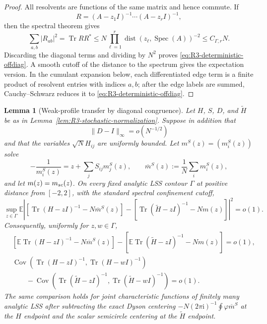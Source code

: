 \documentclass[10pt,a4paper]{amsart}
\newtheorem{lemma}[theorem]{Lemma}
\newcommand{\E}{\mathbb E}
\newcommand{\Cov}{\operatorname{Cov}}
\newcommand{\Tr}{\operatorname{Tr}}
\newcommand{\spec}{\operatorname{Spec}}
\newcommand{\ii}{\mathrm i}
\newcommand{\norm}[1]{\lVert #1\rVert}
\begin{document}
\begin{proof}
All resolvents are functions of the same matrix and hence commute.  If
\[
 R=(A-z_1I)^{-1}\cdots(A-z_rI)^{-1},
\]
then the spectral theorem gives
\[
 \sum_{a,b}|R_{ab}|^2=\Tr RR^*
 \le N\prod_{\ell=1}^r
 \operatorname{dist}(z_\ell,\spec(A))^{-2}
 \le C_{\Gamma,r}N.
\]
Discarding the diagonal terms and dividing by \(N^2\) proves
\eqref{eq:R3-deterministic-offdiag}.  A smooth cutoff of the distance to the
spectrum gives the expectation version.  In the cumulant expansion below,
each differentiated edge term is a finite product of resolvent entries with
indices \(a,b\); after the edge labels are summed, Cauchy--Schwarz reduces it
to \eqref{eq:R3-deterministic-offdiag}.
\end{proof}

\begin{lemma}[Weak-profile transfer by diagonal congruence]
\label{lem:R3-profile-interpolation}
Let \(H\), \(S\), \(D\), and \(\widetilde H\) be as in
Lemma~\ref{lem:R3-stochastic-normalization}.  Suppose in addition that
\begin{equation}\label{eq:R3-congruence-rate}
 \norm{D-I}_\infty=o(N^{-1/2})
\end{equation}
and that the variables \(\sqrt N H_{ij}\) are uniformly bounded.  Let
\(m^S(z)=(m_i^S(z))\) solve
\begin{equation}\label{eq:R3-congruence-QVE}
 -\frac1{m_i^S(z)}=z+\sum_jS_{ij}m_j^S(z),
 \qquad
 \overline m^S(z):=\frac1N\sum_i m_i^S(z),
\end{equation}
and let \(m(z)=m_{\rm sc}(z)\).  On every fixed analytic LSS contour
\(\Gamma\) at positive distance from \([-2,2]\), with the standard spectral
confinement cutoff,
\begin{equation}\label{eq:R3-congruence-L2}
 \sup_{z\in\Gamma}\E\left|
 \left[\Tr(H-zI)^{-1}-N\overline m^S(z)\right]
 -\left[\Tr(\widetilde H-zI)^{-1}-Nm(z)\right]
 \right|^2=o(1).
\end{equation}
Consequently, uniformly for \(z,w\in\Gamma\),
\begin{align}
 &\left[\E\Tr(H-zI)^{-1}-N\overline m^S(z)\right]
 -\left[\E\Tr(\widetilde H-zI)^{-1}-Nm(z)\right]=o(1),
 \label{eq:R3-interpolation-bias}\\
 &\Cov\!\left(\Tr(H-zI)^{-1},\Tr(H-wI)^{-1}\right)
 \nonumber\\
 &\qquad-
 \Cov\!\left(\Tr(\widetilde H-zI)^{-1},
              \Tr(\widetilde H-wI)^{-1}\right)=o(1).
 \label{eq:R3-interpolation-cov}
\end{align}
The same comparison holds for joint characteristic functions of finitely many
analytic LSS after subtracting the exact Dyson centering
\(-N(2\pi\ii)^{-1}\oint\varphi\overline m^S\) at the \(H\) endpoint and the
scalar semicircle centering at the \(\widetilde H\) endpoint.
\end{lemma}
\end{document}
